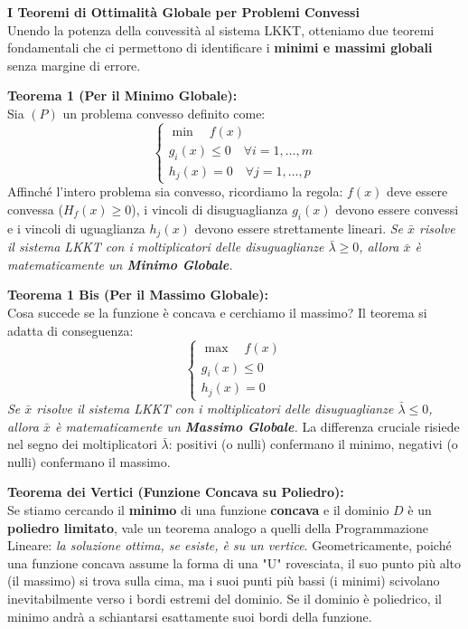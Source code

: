 \documentclass[12pt, a4paper]{article}
\begin{document}
	\vspace{0.4cm}
	\textbf{I Teoremi di Ottimalità Globale per Problemi Convessi}\\
	Unendo la potenza della convessità al sistema LKKT, otteniamo due teoremi fondamentali che ci permettono di identificare i \textbf{minimi e massimi globali} senza margine di errore.
	
	\textbf{Teorema 1 (Per il Minimo Globale):}\\
	Sia $(P)$ un problema convesso definito come:
	\[
	\begin{cases}
		\min \quad f(x) \\
		g_i(x) \le 0 \quad \forall i=1,\dots,m \\
		h_j(x) = 0 \quad \forall j=1,\dots,p
	\end{cases}
	\]
	Affinché l'intero problema sia convesso, ricordiamo la regola: $f(x)$ deve essere convessa ($H_f(x) \ge 0$), i vincoli di disuguaglianza $g_i(x)$ devono essere convessi e i vincoli di uguaglianza $h_j(x)$ devono essere strettamente lineari.
	\textit{Se $\bar{x}$ risolve il sistema LKKT con i moltiplicatori delle disuguaglianze $\bar{\lambda} \ge 0$, allora $\bar{x}$ è matematicamente un \textbf{Minimo Globale}.}
	
	\textbf{Teorema 1 Bis (Per il Massimo Globale):}\\
	Cosa succede se la funzione è concava e cerchiamo il massimo? Il teorema si adatta di conseguenza:
	\[
	\begin{cases}
		\max \quad f(x) \\
		g_i(x) \le 0 \\
		h_j(x) = 0
	\end{cases}
	\]
	\textit{Se $\bar{x}$ risolve il sistema LKKT con i moltiplicatori delle disuguaglianze $\bar{\lambda} \le 0$, allora $\bar{x}$ è matematicamente un \textbf{Massimo Globale}.}
	La differenza cruciale risiede nel segno dei moltiplicatori $\bar{\lambda}$: positivi (o nulli) confermano il minimo, negativi (o nulli) confermano il massimo.
	
	\textbf{Teorema dei Vertici (Funzione Concava su Poliedro):}\\
	Se stiamo cercando il \textbf{minimo} di una funzione \textbf{concava} e il dominio $D$ è un \textbf{poliedro limitato}, vale un teorema analogo a quelli della Programmazione Lineare: \textit{la soluzione ottima, se esiste, è su un vertice}. 
	Geometricamente, poiché una funzione concava assume la forma di una "U" rovesciata, il suo punto più alto (il massimo) si trova sulla cima, ma i suoi punti più bassi (i minimi) scivolano inevitabilmente verso i bordi estremi del dominio. Se il dominio è poliedrico, il minimo andrà a schiantarsi esattamente suoi bordi della funzione.
	
\end{document}
